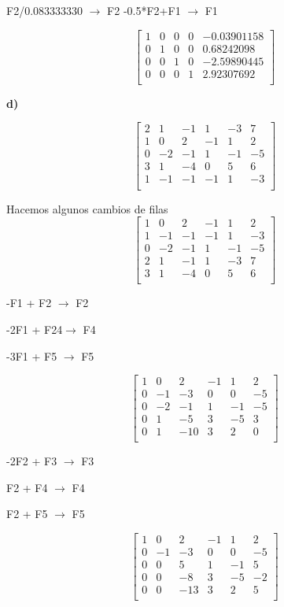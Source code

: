 \documentclass[12pt]{article}
\begin{document}
F2/0.083333330 $\longrightarrow $ F2
-0.5*F2+F1 $\longrightarrow $ F1

\[
\begin{bmatrix}
1 & 0 & 0 & 0 & -0.03901158\\
0 & 1 & 0 & 0 & 0.68242098\\
0 & 0 & 1 & 0 & -2.59890445\\
0 & 0 & 0 & 1 & 2.92307692\\
\end{bmatrix}
\]


\textbf{d)}

\[
\begin{bmatrix}
2 & 1 & -1 & 1 & -3 & 7\\
1 & 0 & 2 & -1 & 1 & 2\\
0 & -2 & -1 & 1 & -1 & -5\\
3 & 1 & -4 & 0 & 5 & 6\\
1 & -1 & -1 & -1 & 1 & -3\\
\end{bmatrix}
\]

Hacemos algunos cambios de filas
\[
\begin{bmatrix}
1 & 0 & 2 & -1 & 1 & 2\\ 
1 & -1 & -1 & -1 & 1 & -3\\
0 & -2 & -1 & 1 & -1 & -5\\   
2 & 1 & -1 & 1 & -3 & 7\\
3 & 1 & -4 & 0 & 5 & 6\\
\end{bmatrix}
\]

-F1 + F2 $\longrightarrow $ F2

-2F1 + F24$\longrightarrow $ F4

-3F1 + F5 $\longrightarrow $ F5

\[
\begin{bmatrix}
1 & 0 & 2 & -1 & 1 & 2\\ 
0 & -1 & -3 & 0 & 0 & -5\\
0 & -2 & -1 & 1 & -1 & -5\\   
0 & 1 & -5 & 3 & -5 & 3\\
0 & 1 & -10 & 3 & 2 & 0\\
\end{bmatrix}
\]

-2F2 + F3 $\longrightarrow $ F3

F2 + F4 $\longrightarrow $ F4

F2 + F5 $\longrightarrow $ F5

\[
\begin{bmatrix}
1 & 0 & 2 & -1 & 1 & 2\\ 
0 & -1 & -3 & 0 & 0 & -5\\
0 & 0 & 5 & 1 & -1 & 5\\   
0 & 0 & -8 & 3 & -5 & -2\\
0 & 0 & -13 & 3 & 2 & 5\\
\end{bmatrix}
\]
\end{document}
